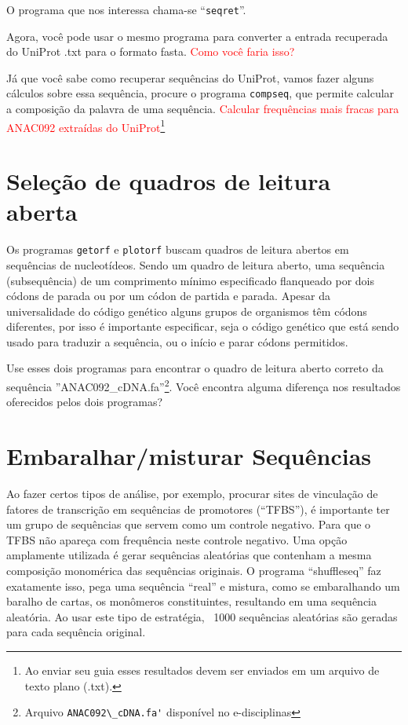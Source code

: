 \documentclass[letter,11pt]{book}
\begin{document}
O programa que nos interessa chama-se ``\Verb+seqret+''.

Agora, você pode usar o mesmo programa para converter a entrada recuperada do UniProt .txt para o formato fasta. \textcolor{red}{Como você faria isso?}

Já que você sabe como recuperar sequências do UniProt, vamos fazer alguns cálculos sobre essa sequência, procure o programa \Verb+compseq+, que permite calcular a composição da palavra de uma sequência. \textcolor{red}{Calcular frequências mais fracas para ANAC092 extraídas do UniProt}\footnote{Ao enviar seu guia esses resultados devem ser enviados em um arquivo de texto plano (.txt).}

\section{Seleção de quadros de leitura aberta}

Os programas \Verb+getorf+ e \Verb+plotorf+ buscam quadros de leitura abertos em sequências de nucleotídeos. Sendo um quadro de leitura aberto, uma sequência (subsequência) de um comprimento mínimo especificado flanqueado por dois códons de parada ou por um códon de partida e parada. Apesar da universalidade do código genético alguns grupos de organismos têm códons diferentes, por isso é importante especificar, seja o código genético que está sendo usado para traduzir a sequência, ou o início e parar códons permitidos.

{
\color{red}Use esses dois programas para encontrar o quadro de leitura aberto correto da sequência ''ANAC092\_cDNA.fa''\footnote{Arquivo \Verb+ANAC092\_cDNA.fa'+ disponível no e-disciplinas}. Você encontra alguma diferença nos resultados oferecidos pelos dois programas? 
}


\section{Embaralhar/misturar Sequências}

Ao fazer certos tipos de análise, por exemplo, procurar sites de vinculação de fatores de transcrição em sequências de promotores (``TFBS''), é importante ter um grupo de sequências que servem como um controle negativo. Para que o TFBS não apareça com frequência neste controle negativo. Uma opção amplamente utilizada é gerar sequências aleatórias que contenham a mesma composição monomérica das sequências originais. O programa ``shuffleseq'' faz exatamente isso, pega uma sequência ``real'' e mistura, como se embaralhando um baralho de cartas, os monômeros constituintes, resultando em uma sequência aleatória. Ao usar este tipo de estratégia, ~1000 sequências aleatórias são geradas para cada sequência original.
\end{document}

